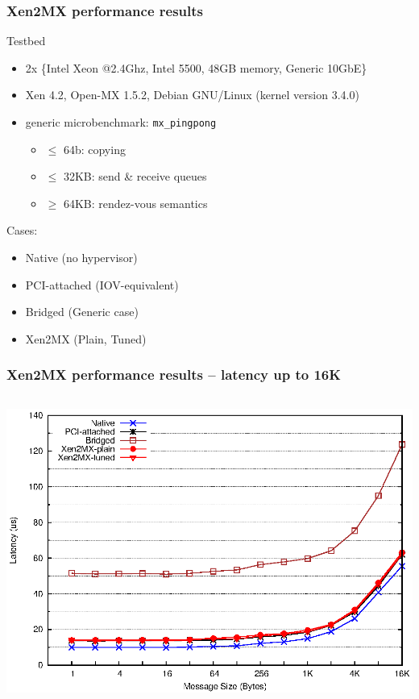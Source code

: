 \documentclass[red,slidestop,notes,compress,mathserif]{beamer}
\begin{document}
\begin{frame}
\frametitle{Xen2MX performance results}
\begin{block}{Testbed}
\begin{itemize}
\item 2x \{Intel Xeon @2.4Ghz, Intel 5500, 48GB memory, Generic 10GbE\}
\item Xen 4.2, Open-MX 1.5.2, Debian GNU/Linux (kernel version 3.4.0)
\item generic microbenchmark: \texttt{mx\_pingpong}
\begin{itemize}
\item$\leq$ 64b: copying
\item$\leq$ 32KB: send \& receive queues
\item$\geq$ 64KB: rendez-vous semantics
\end{itemize}
\end{itemize}
\end{block}
\begin{block}{Cases:}
\begin{itemize}
\item Native (no hypervisor)
\item PCI-attached (IOV-equivalent)
\item Bridged (Generic case)
\item Xen2MX (Plain, Tuned)
\end{itemize}
\end{block}
\end{frame}


\begin{frame}
\frametitle{Xen2MX performance results -- latency up to 16K }
\begin{columns}
\includegraphics[width=\textwidth]{figs/bare/latency_zoom.eps}
\end{columns}
\end{frame}
\end{document}
